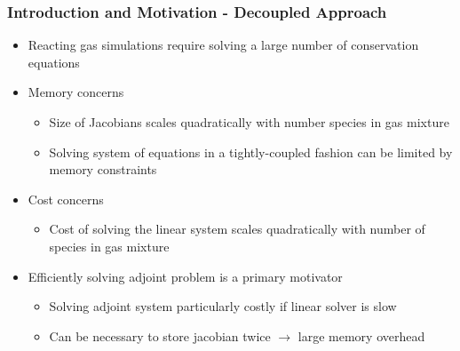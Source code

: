 \documentclass{beamer}
\begin{document}
\begin{frame}
  \frametitle{Introduction and Motivation - Decoupled Approach}
  \begin{itemize}
    \item Reacting gas simulations require solving a large number of conservation
      equations
    \item Memory concerns
    \begin{itemize}
        \item Size of Jacobians scales quadratically with number species in gas mixture
        \item Solving system of equations in a tightly-coupled fashion can be
          limited by memory constraints
    \end{itemize}
    \item Cost concerns
    \begin{itemize}
      \item Cost of solving the linear system scales quadratically with number
      of species in gas mixture
    \end{itemize}
    \item Efficiently solving adjoint problem is a primary motivator
      \begin{itemize}
        \item Solving adjoint system particularly costly if linear solver is
          slow
        \item Can be necessary to store jacobian twice $\to$ large memory
          overhead
      \end{itemize}
  \end{itemize}
\end{frame}
\end{document}
